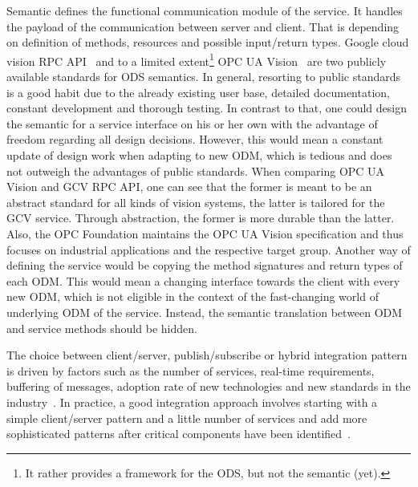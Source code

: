 \begin{table}[ht]
\begin{center}
\begin{minipage}{\textwidth}
      \end{minipage}
    \end{center}
\end{table}%


Semantic defines the functional communication module of the service. It handles the payload of the communication between server and client. That is depending on definition of methods, resources and possible input/return types. Google cloud vision RPC API~\cite{Google-Cloud-Documentation2018Cloud2018} and to a limited extent\footnote{It rather provides a framework for the ODS, but not the semantic (yet).} OPC UA Vision~\cite{VDMA2018OPC40100-1:2018-11} are two publicly available standards for ODS semantics. In general, resorting to public standards is a good habit due to the already existing user base, detailed documentation, constant development and thorough testing. In contrast to that, one could design the semantic for a service interface on his or her own with the advantage of freedom regarding all design decisions. However, this would mean a constant update of design work when adapting to new ODM, which is tedious and does not outweigh the advantages of public standards. When comparing OPC UA Vision and GCV RPC API, one can see that the former is meant to be an abstract standard for all kinds of vision systems, the latter is tailored for the GCV service. Through abstraction, the former is more durable than the latter. Also, the OPC Foundation maintains the OPC UA Vision specification and thus focuses on industrial applications and the respective target group. Another way of defining the service would be copying the method signatures and return types of each ODM. This would mean a changing interface towards the client with every new ODM, which is not eligible in the context of the fast-changing world of underlying ODM of the service. Instead, the semantic translation between ODM and service methods should be hidden. 

The choice between client/server, publish/subscribe or hybrid integration pattern is driven by factors such as the number of services, real-time requirements, buffering of messages, adoption rate of new technologies and new standards in the industry~\cite{Bianco2007EvaluatingArchitecture}. In practice, a good integration approach involves starting with a simple client/server pattern and a little number of services and add more sophisticated patterns after critical components have been identified~\cite{Newman2015BuildingMicroservices}.

